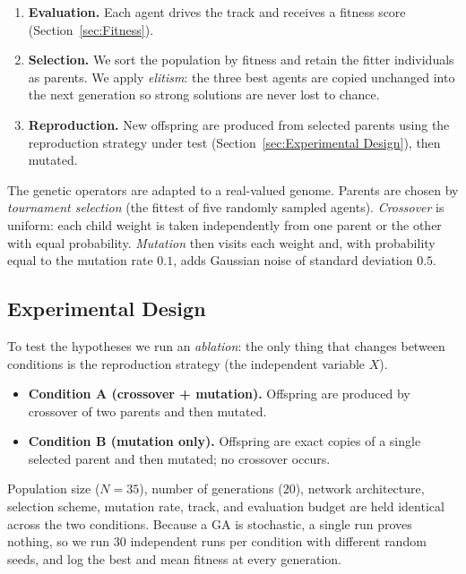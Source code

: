 \documentclass[a4paper, twocolumn]{article}
\begin{document}
\begin{enumerate}
    \item \textbf{Evaluation.} Each agent drives the track and receives a fitness score
    (Section~\ref{sec:Fitness}).
    \item \textbf{Selection.} We sort the population by fitness and retain the fitter
    individuals as parents. We apply \emph{elitism}: the three best agents are copied unchanged
    into the next generation so strong solutions are never lost to chance.
    \item \textbf{Reproduction.} New offspring are produced from selected parents using the
    reproduction strategy under test (Section~\ref{sec:Experimental Design}), then mutated.
\end{enumerate}

The genetic operators are adapted to a real-valued genome. Parents are chosen by
\emph{tournament selection} (the fittest of five randomly sampled agents). \emph{Crossover} is
uniform: each child weight is taken independently from one parent or the other with equal
probability. \emph{Mutation} then visits each weight and, with probability equal to the mutation
rate $0.1$, adds Gaussian noise of standard deviation $0.5$.

\subsection{Experimental Design\label{sec:Experimental Design}}

To test the hypotheses we run an \emph{ablation}: the only thing that changes between
conditions is the reproduction strategy (the independent variable $X$).

\begin{itemize}
    \item \textbf{Condition A (crossover + mutation).} Offspring are produced by crossover of
    two parents and then mutated.
    \item \textbf{Condition B (mutation only).} Offspring are exact copies of a single selected
    parent and then mutated; no crossover occurs.
\end{itemize}

Population size ($N=35$), number of generations ($20$), network architecture, selection scheme,
mutation rate, track, and evaluation budget are held identical across the two conditions. Because
a GA is stochastic, a single run proves nothing, so we run $30$
independent runs per condition with different random seeds, and log the best and mean fitness
at every generation.
\end{document}
